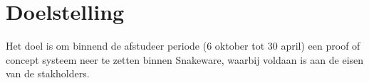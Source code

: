 \section{Doelstelling}
Het doel is om binnend de afstudeer periode (6 oktober tot 30 april) een proof of concept systeem neer te zetten binnen Snakeware, waarbij voldaan is aan de eisen van de stakholders.

